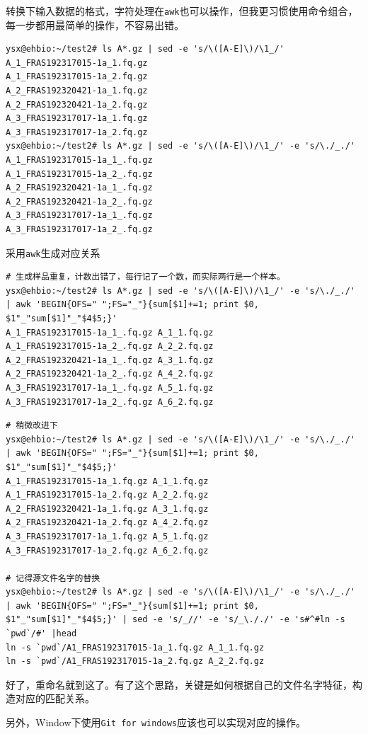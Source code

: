\documentclass[]{article}
\numberwithin{figure}{section}
\numberwithin{table}{section}
\begin{document}
转换下输入数据的格式，字符处理在\texttt{awk}也可以操作，但我更习惯使用命令组合，每一步都用最简单的操作，不容易出错。

\begin{verbatim}
ysx@ehbio:~/test2# ls A*.gz | sed -e 's/\([A-E]\)/\1_/'
A_1_FRAS192317015-1a_1.fq.gz
A_1_FRAS192317015-1a_2.fq.gz
A_2_FRAS192320421-1a_1.fq.gz
A_2_FRAS192320421-1a_2.fq.gz
A_3_FRAS192317017-1a_1.fq.gz
A_3_FRAS192317017-1a_2.fq.gz
ysx@ehbio:~/test2# ls A*.gz | sed -e 's/\([A-E]\)/\1_/' -e 's/\./_./'
A_1_FRAS192317015-1a_1_.fq.gz
A_1_FRAS192317015-1a_2_.fq.gz
A_2_FRAS192320421-1a_1_.fq.gz
A_2_FRAS192320421-1a_2_.fq.gz
A_3_FRAS192317017-1a_1_.fq.gz
A_3_FRAS192317017-1a_2_.fq.gz
\end{verbatim}

采用\texttt{awk}生成对应关系

\begin{verbatim}
# 生成样品重复，计数出错了，每行记了一个数，而实际两行是一个样本。
ysx@ehbio:~/test2# ls A*.gz | sed -e 's/\([A-E]\)/\1_/' -e 's/\./_./' | awk 'BEGIN{OFS=" ";FS="_"}{sum[$1]+=1; print $0, $1"_"sum[$1]"_"$4$5;}'
A_1_FRAS192317015-1a_1_.fq.gz A_1_1.fq.gz
A_1_FRAS192317015-1a_2_.fq.gz A_2_2.fq.gz
A_2_FRAS192320421-1a_1_.fq.gz A_3_1.fq.gz
A_2_FRAS192320421-1a_2_.fq.gz A_4_2.fq.gz
A_3_FRAS192317017-1a_1_.fq.gz A_5_1.fq.gz
A_3_FRAS192317017-1a_2_.fq.gz A_6_2.fq.gz
\end{verbatim}

\begin{verbatim}
# 稍微改进下
ysx@ehbio:~/test2# ls A*.gz | sed -e 's/\([A-E]\)/\1_/' -e 's/\./_./' | awk 'BEGIN{OFS=" ";FS="_"}{sum[$1]+=1; print $0, $1"_"sum[$1]"_"$4$5;}'
A_1_FRAS192317015-1a_1.fq.gz A_1_1.fq.gz
A_1_FRAS192317015-1a_2.fq.gz A_2_2.fq.gz
A_2_FRAS192320421-1a_1.fq.gz A_3_1.fq.gz
A_2_FRAS192320421-1a_2.fq.gz A_4_2.fq.gz
A_3_FRAS192317017-1a_1.fq.gz A_5_1.fq.gz
A_3_FRAS192317017-1a_2.fq.gz A_6_2.fq.gz

# 记得源文件名字的替换
ysx@ehbio:~/test2# ls A*.gz | sed -e 's/\([A-E]\)/\1_/' -e 's/\./_./' | awk 'BEGIN{OFS=" ";FS="_"}{sum[$1]+=1; print $0, $1"_"sum[$1]"_"$4$5;}' | sed -e 's/_//' -e 's/_\././' -e 's#^#ln -s `pwd`/#' |head
ln -s `pwd`/A1_FRAS192317015-1a_1.fq.gz A_1_1.fq.gz
ln -s `pwd`/A1_FRAS192317015-1a_2.fq.gz A_2_2.fq.gz
\end{verbatim}

好了，重命名就到这了。有了这个思路，关键是如何根据自己的文件名字特征，构造对应的匹配关系。

另外，Window下使用\texttt{Git\ for\ windows}应该也可以实现对应的操作。
\end{document}
